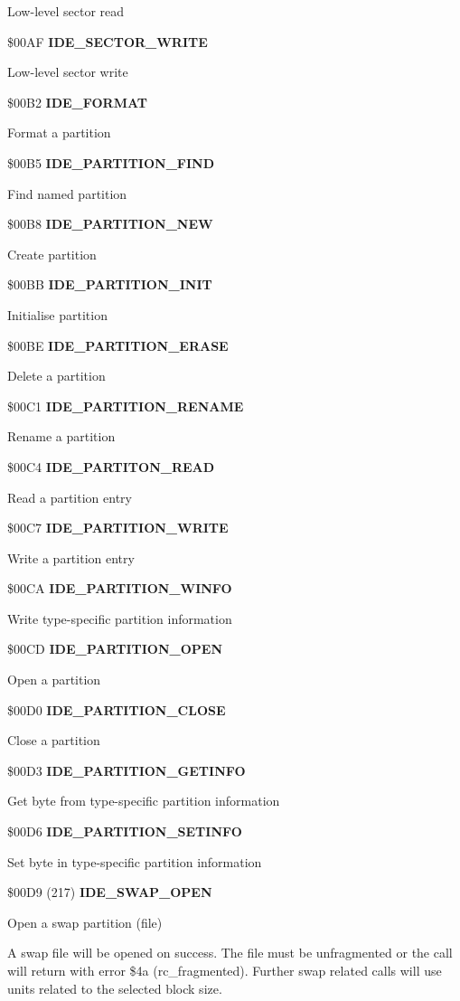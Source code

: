 Low-level sector read

\$00AF \textbf{IDE\_SECTOR\_WRITE}

Low-level sector write

\$00B2 \textbf{IDE\_FORMAT}

Format a partition

\$00B5 \textbf{IDE\_PARTITION\_FIND}

Find named partition

\$00B8 \textbf{IDE\_PARTITION\_NEW}

Create partition

\$00BB \textbf{IDE\_PARTITION\_INIT}

Initialise partition

\$00BE \textbf{IDE\_PARTITION\_ERASE}

Delete a partition

\$00C1 \textbf{IDE\_PARTITION\_RENAME}

Rename a partition

\$00C4 \textbf{IDE\_PARTITON\_READ}

Read a partition entry

\$00C7 \textbf{IDE\_PARTITION\_WRITE}

Write a partition entry

\$00CA \textbf{IDE\_PARTITION\_WINFO}

Write type-specific partition information

\$00CD \textbf{IDE\_PARTITION\_OPEN}

Open a partition

\$00D0 \textbf{IDE\_PARTITION\_CLOSE}

Close a partition

\$00D3 \textbf{IDE\_PARTITION\_GETINFO}

Get byte from type-specific partition information

\$00D6 \textbf{IDE\_PARTITION\_SETINFO}

Set byte in type-specific partition information

\$00D9 (217) \textbf{IDE\_SWAP\_OPEN}

Open a swap partition (file)

A swap file will be opened on success. The file must be unfragmented
or the call will return with error \$4a (rc\_fragmented). Further swap
related calls will use units related to the selected block size.

